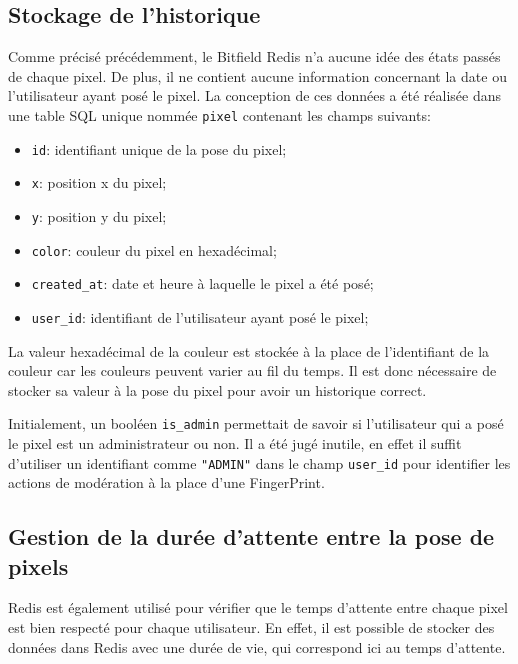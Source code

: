 \subsection{Stockage de l'historique}

Comme précisé précédemment, le Bitfield Redis n'a aucune idée des états passés de chaque pixel. De plus, il ne contient aucune information concernant la date ou l'utilisateur ayant posé le pixel. La conception de ces données a été réalisée dans une table SQL unique nommée \texttt{pixel} contenant les champs suivants:

\begin{itemize}
  \item \texttt{id}: identifiant unique de la pose du pixel;
  \item \texttt{x}: position x du pixel;
  \item \texttt{y}: position y du pixel;
  \item \texttt{color}: couleur du pixel en hexadécimal;
  \item \texttt{created\_at}: date et heure à laquelle le pixel a été posé;
  \item \texttt{user\_id}: identifiant de l'utilisateur ayant posé le pixel;
\end{itemize}

La valeur hexadécimal de la couleur est stockée à la place de l'identifiant de la couleur car les couleurs peuvent varier au fil du temps. Il est donc nécessaire de stocker sa valeur à la pose du pixel pour avoir un historique correct.

Initialement, un booléen \texttt{is\_admin} permettait de savoir si l'utilisateur qui a posé le pixel est un administrateur ou non. Il a été jugé inutile, en effet il suffit d'utiliser un identifiant comme \texttt{"ADMIN"} dans le champ \texttt{user\_id} pour identifier les actions de modération à la place d'une FingerPrint.

\subsection{Gestion de la durée d'attente entre la pose de pixels}

Redis est également utilisé pour vérifier que le temps d'attente entre chaque pixel est bien respecté pour chaque utilisateur. En effet, il est possible de stocker des données dans Redis avec une durée de vie, qui correspond ici au temps d'attente.

